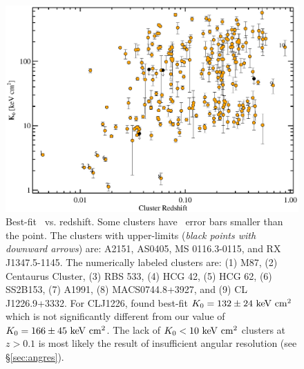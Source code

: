 \begin{figure}[htp]
  \begin{center}
    \begin{minipage}[htp]{0.9\linewidth}
      \includegraphics*[width=\textwidth, trim=5mm 0mm 5mm 5mm, clip]{k0res.eps}
      \caption{Best-fit \kna\ vs. redshift. Some clusters have
        \kna\ error bars smaller than the point. The clusters with
        upper-limits ({\it{black points with downward arrows}}) are:
        A2151, AS0405, MS 0116.3-0115, and RX J1347.5-1145. The
        numerically labeled clusters are: (1) M87, (2) Centaurus
        Cluster, (3) RBS 533, (4) HCG 42, (5) HCG 62, (6) SS2B153, (7)
        A1991, (8) MACS0744.8+3927, and (9) CL J1226.9+3332. For
        CLJ1226, \cite{2007ApJ...659.1125M} found best-fit $K_0 = 132
        \pm 24 \mathrm{\mbox{\ensuremath{\mathrm{~keV}}} \mathrm{\mbox{\ensuremath{\mathrm{~cm}}}^2}}$ which is not significantly different from our
        value of $K_0 = 166 \pm 45 \mathrm{\mbox{\ensuremath{\mathrm{~keV}}} \mathrm{\mbox{\ensuremath{\mathrm{~cm}}}^2}}$. The lack of $K_0 < 10
        \mathrm{\mbox{\ensuremath{\mathrm{~keV}}} \mathrm{\mbox{\ensuremath{\mathrm{~cm}}}^2}}$ clusters at $z > 0.1$ is most likely the result of
        insufficient angular resolution (see \S\ref{sec:angres}).}
      \label{fig:k0res}
    \end{minipage}
  \end{center}
\end{figure}
\clearpage

